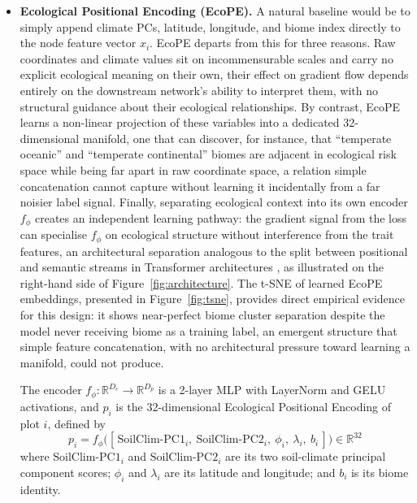 \documentclass[a4paper,fleqn]{cas-sc}
\begin{document}
\begin{itemize}[leftmargin=1.4em]
\item \textbf{Ecological Positional Encoding (EcoPE).} A natural baseline would be to simply append climate PCs, latitude, longitude, and biome index directly to the node feature vector $x_i$. EcoPE departs from this for three reasons. Raw coordinates and climate values sit on incommensurable scales and carry no explicit ecological meaning on their own, their effect on gradient flow depends entirely on the downstream network's ability to interpret them, with no structural guidance about their ecological relationships. By contrast, EcoPE learns a non-linear projection of these variables into a dedicated 32-dimensional manifold, one that can discover, for instance, that ``temperate oceanic'' and ``temperate continental'' biomes are adjacent in ecological risk space while being far apart in raw coordinate space, a relation simple concatenation cannot capture without learning it incidentally from a far noisier label signal. Finally, separating ecological context into its own encoder $f_\phi$ creates an independent learning pathway: the gradient signal from the loss can specialise $f_\phi$ on ecological structure without interference from the trait features, an architectural separation analogous to the split between positional and semantic streams in Transformer architectures \citep{vaswani2017}, as illustrated on the right-hand side of Figure~\ref{fig:architecture}. The t-SNE of learned EcoPE embeddings, presented in Figure~\ref{fig:tsne}, provides direct empirical evidence for this design: it shows near-perfect biome cluster separation despite the model never receiving biome as a training label, an emergent structure that simple feature concatenation, with no architectural pressure toward learning a manifold, could not produce.

The encoder $f_\phi: \mathbb{R}^{D_c} \to \mathbb{R}^{D_p}$ is a 2-layer MLP with LayerNorm and GELU activations, and $p_i$ is the 32-dimensional Ecological Positional Encoding of plot $i$, defined by
\begin{equation}
p_i = f_\phi\big([\,\text{SoilClim-PC1}_i,\ \text{SoilClim-PC2}_i,\ \phi_i,\ \lambda_i,\ b_i\,]\big) \in \mathbb{R}^{32}
\end{equation}
where $\text{SoilClim-PC1}_i$ and $\text{SoilClim-PC2}_i$ are its two soil-climate principal component scores; $\phi_i$ and $\lambda_i$ are its latitude and longitude; and $b_i$ is its biome identity.


\end{itemize}
\end{document}
